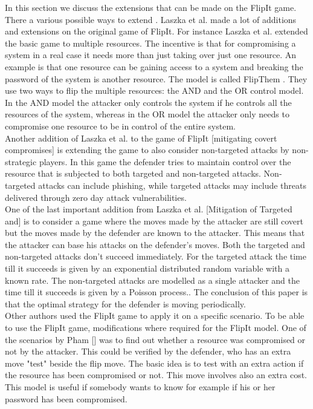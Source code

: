 In this section we discuss the extensions that can be made on the FlipIt game. \\


There a various possible ways to extend . 
Laszka et al. made a lot of additions and extensions on the original game of FlipIt. For instance Laszka et al. extended the basic  game to multiple resources. The incentive is that for compromising a system in a real case it needs more than just taking over just one resource. An example is that one resource can be gaining access to a system and breaking the password of the system is another resource. The model is called FlipThem \cite{FlipThem}. They use two ways to flip the multiple resources: the AND and the OR control model. In the AND model the attacker only controls the system if he controls all the resources of the system, whereas in the OR model the attacker only needs to compromise one resource to be in control of the entire system. \\
Another addition of Laszka et al. to the game of FlipIt [mitigating covert compromises] is extending the game to also consider non-targeted attacks by non-strategic players. In this game the defender tries to maintain control over the resource that is subjected to both targeted and non-targeted attacks. Non-targeted attacks can include phishing, while targeted attacks may include threats delivered through zero day attack vulnerabilities. \\
One of the last important addition from Laszka et al. [Mitigation of Targeted and] is to consider a game where the moves made by the attacker are still covert but the moves made by the defender are known to the attacker. This means that the attacker can base his attacks on the defender's moves. Both the targeted and non-targeted attacks don't succeed immediately. For the targeted attack the time till it succeeds is given by an exponential distributed random variable with a known rate. The non-targeted attacks are modelled as a single attacker and the time till it succeeds is given by a Poisson process.. The conclusion of this paper is that the optimal strategy for the defender is moving periodically. \\ 

Other authors used the FlipIt game to apply it on a specific scenario. To be able to use the FlipIt game, modifications where required for the FlipIt model.
One of the scenarios by Pham\cite{GameTheorApprCostBenefitAnalyses} [] was to find out whether a resource was compromised or not by the attacker. This could be verified by the defender, who has an extra move "test" beside the flip move. The basic idea is to test with an extra action if the resource has been compromised or not. This move involves also an extra cost. This model is useful if somebody wants to know for example if his or her password has been compromised.   \\

